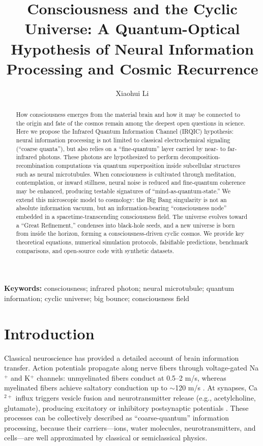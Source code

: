 \documentclass[11pt,a4paper]{article}
\title{\textbf{Consciousness and the Cyclic Universe: A Quantum-Optical Hypothesis of Neural Information Processing and Cosmic Recurrence}}
\author[1]{Xiaohui Li}
\affil[1]{Independent Researcher, Baoji, China}
\affil[ ]{Correspondence: Xiaohui Li (email: \texttt{danceluck@163.com}); ORCID: 0009-0003-8233-7191}
\affil[ ]{Data and code homepage: \url{https://github.com/xiaohui-li-lab/}}
\date{}
\begin{document}
\maketitle

\begin{abstract}
\noindent
How consciousness emerges from the material brain and how it may be connected to the origin and fate of the cosmos remain among the deepest open questions in science. Here we propose the Infrared Quantum Information Channel (IRQIC) hypothesis: neural information processing is not limited to classical electrochemical signaling (``coarse quanta''), but also relies on a ``fine-quantum'' layer carried by near- to far-infrared photons. These photons are hypothesized to perform decomposition-recombination computations via quantum superposition inside subcellular structures such as neural microtubules. When consciousness is cultivated through meditation, contemplation, or inward stillness, neural noise is reduced and fine-quantum coherence may be enhanced, producing testable signatures of ``mind-as-quantum-state.'' We extend this microscopic model to cosmology: the Big Bang singularity is not an absolute information vacuum, but an information-bearing ``consciousness node'' embedded in a spacetime-transcending consciousness field. The universe evolves toward a ``Great Refinement,'' condenses into black-hole seeds, and a new universe is born from inside the horizon, forming a consciousness-driven cyclic cosmos. We provide key theoretical equations, numerical simulation protocols, falsifiable predictions, benchmark comparisons, and open-source code with synthetic datasets.
\end{abstract}

\noindent\textbf{Keywords:} consciousness; infrared photon; neural microtubule; quantum information; cyclic universe; big bounce; consciousness field

\section{Introduction}

Classical neuroscience has provided a detailed account of brain information transfer. Action potentials propagate along nerve fibers through voltage-gated Na$^+$ and K$^+$ channels: unmyelinated fibers conduct at 0.5--2 m/s, whereas myelinated fibers achieve saltatory conduction up to $\sim$120 m/s \cite{Hodgkin1952,Waxman1980}. At synapses, Ca$^{2+}$ influx triggers vesicle fusion and neurotransmitter release (e.g., acetylcholine, glutamate), producing excitatory or inhibitory postsynaptic potentials \cite{Katz1969}. These processes can be collectively described as ``coarse-quantum'' information processing, because their carriers---ions, water molecules, neurotransmitters, and cells---are well approximated by classical or semiclassical physics.
\end{document}
